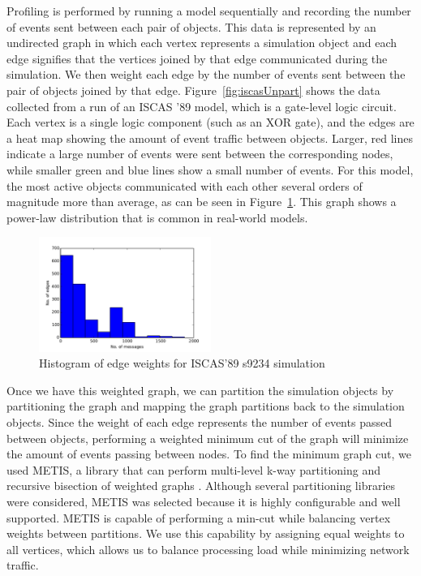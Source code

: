 \documentclass{wscpaperproc}
\begin{document}
Profiling is performed by running a model sequentially and recording the number of events sent between each pair of objects. This data is represented by an undirected graph in which each vertex represents a simulation object and each edge signifies that the vertices joined by that edge communicated during the simulation. We then weight each edge by the number of events sent between the pair of objects joined by that edge. Figure~\ref{fig:iscasUnpart} shows the data collected from a run of an ISCAS ’89 model, which is a gate-level logic circuit. Each vertex is a single logic component (such as an XOR gate), and the edges are a heat map showing the amount of event traffic between objects. Larger, red lines indicate a large number of events were sent between the corresponding nodes, while smaller green and blue lines show a small number of events. For this model, the most active objects communicated with each other several orders of magnitude more than average, as can be seen in Figure~\ref{fig:s9234_histo}. This graph shows a power-law distribution that is common in real-world models.

\begin{figure}
\centering
\includegraphics[clip=true,width=0.5\textwidth]{figs/s9234_histo}
\caption{Histogram of edge weights for ISCAS'89 s9234 simulation}\label{fig:s9234_histo} 
\end{figure}

Once we have this weighted graph, we can partition the simulation objects by partitioning the graph and mapping the graph partitions back to the simulation objects. Since the weight of each edge represents the number of events passed between objects, performing a weighted minimum cut of the graph will minimize the amount of events passing between nodes. To find the minimum graph cut, we used METIS, a library that can perform multi-level k-way partitioning and recursive bisection of weighted graphs \cite{karypis-98}. Although several partitioning libraries were considered, METIS was selected because it is highly configurable and well supported. METIS is capable of performing a min-cut while balancing vertex weights between partitions. We use this capability by assigning equal weights to all vertices, which allows us to balance processing load while minimizing network traffic.
\end{document}
